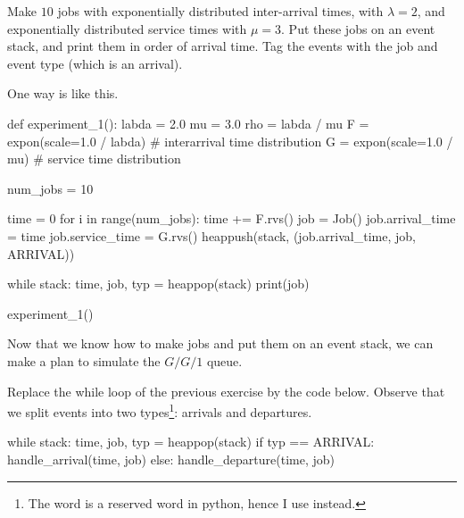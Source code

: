 \begin{exercise}\label{ex:3}
  Make $10$ jobs with exponentially distributed inter-arrival times, with $\lambda=2$,  and exponentially distributed service times with $\mu=3$. Put these jobs on an event stack, and print them in order of arrival time. Tag the events with the job and event type (which is an arrival).
\begin{solution}
One way is like this.
    \begin{pyverbatim}
def experiment_1():
    labda = 2.0
    mu = 3.0
    rho = labda / mu
    F = expon(scale=1.0 / labda)  # interarrival time distribution
    G = expon(scale=1.0 / mu)  # service time distribution

    num_jobs = 10

    time = 0
    for i in range(num_jobs):
        time += F.rvs()
        job = Job()
        job.arrival_time = time
        job.service_time = G.rvs()
        heappush(stack, (job.arrival_time, job, ARRIVAL))

    while stack:
        time, job, typ = heappop(stack)
        print(job)


experiment_1()
    \end{pyverbatim}
  \end{solution}
\end{exercise}

Now that we know how to make jobs and put them on an event stack, we can make a plan to simulate the $G/G/1$ queue.

Replace the while loop of the previous exercise by the code below.
Observe that we split events into two types\footnote{The word  is a reserved word in python, hence I use  instead.}: arrivals and departures.
\begin{pynotangle}
while stack:
    time, job, typ = heappop(stack)
    if typ == ARRIVAL:
        handle_arrival(time, job)
    else:
        handle_departure(time, job)
\end{pynotangle}

